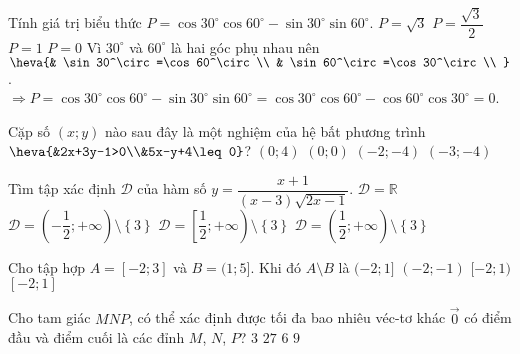 \begin{ex}%
Tính giá trị biểu thức $P=\cos 30^\circ\cos 60^\circ-\sin 30^\circ\sin 60^\circ$.
\choice
{$P=\sqrt{3}$}
{$P=\dfrac{\sqrt{3}}{2}$}
{$P=1$}
{\True $P=0$}
\loigiai
{Vì $30^\circ$ và $60^\circ$ là hai góc phụ nhau nên $\heva{& \sin 30^\circ=\cos 60^\circ \\
& \sin 60^\circ=\cos 30^\circ \\
}$.\\
$\Rightarrow P=\cos 30^\circ\cos 60^\circ-\sin 30^\circ\sin 60^\circ=\cos 30^\circ\cos 60^\circ-\cos 60^\circ\cos 30^\circ=0$.}
\end{ex}

\begin{ex}%
Cặp số $(x;y)$ nào sau đây là một nghiệm của hệ bất phương trình $\heva{&2x+3y-1>0\\&5x-y+4\leq0}$?
\choice
{\True $(0;4)$}
{$(0;0)$}
{$(-2;-4)$}
{$(-3;-4)$}
\end{ex}

\begin{ex}%
Tìm tập xác định $\mathscr{D}$ của hàm số $y=\dfrac{x+1}{(x-3)\sqrt{2x-1}}$.
\choice
{$\mathscr{D}=\mathbb{R}$}
{$\mathscr{D}=\left(-\dfrac{1}{2};+\infty \right)\setminus\left\{3\right\}$}
{$\mathscr{D}=\left[\dfrac{1}{2};+\infty \right)\setminus\left\{3\right\}$}
{\True $\mathscr{D}=\left(\dfrac{1}{2};+\infty \right)\setminus\left\{3\right\}$}
\end{ex}

\begin{ex}%
Cho tập hợp $ A=[-2;3] $ và $ B=(1;5] $. Khi đó $ A\setminus B $ là
\choice
{$(-2;1]$}
{$(-2;-1)$}
{$[-2;1) $}
{\True $[-2;1]$}
\loigiai{
Ta có $ A\setminus B =[-2;3]\setminus(1;5]= [-2;1]$.
}
\end{ex}

\begin{ex}%
Cho tam giác $MNP$, có thể xác định được tối đa bao nhiêu véc-tơ khác $\overrightarrow{0}$ có điểm đầu và điểm cuối là các đỉnh $M$, $N$, $P$?
\choice
{$3$}
{$27$}
{\True $6$}
{$9$}
\end{ex}


